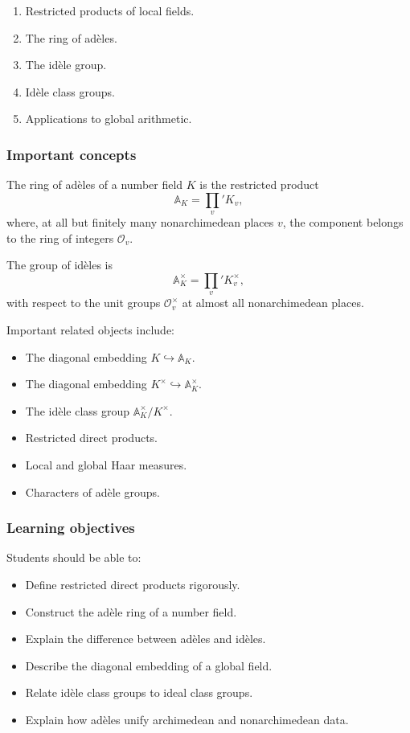 \documentclass[11pt]{article}
\begin{document}
\begin{enumerate}
    \item Restricted products of local fields.
    \item The ring of adèles.
    \item The idèle group.
    \item Idèle class groups.
    \item Applications to global arithmetic.
\end{enumerate}

\subsubsection*{Important concepts}

The ring of adèles of a number field \(K\) is the restricted product
\[
    \mathbb{A}_K
    =
    \prod_v' K_v,
\]
where, at all but finitely many nonarchimedean places \(v\), the component
belongs to the ring of integers \(\mathcal{O}_v\).

The group of idèles is
\[
    \mathbb{A}_K^\times
    =
    \prod_v' K_v^\times,
\]
with respect to the unit groups \(\mathcal{O}_v^\times\) at almost all
nonarchimedean places.

Important related objects include:

\begin{itemize}
    \item The diagonal embedding \(K\hookrightarrow\mathbb{A}_K\).
    \item The diagonal embedding \(K^\times\hookrightarrow\mathbb{A}_K^\times\).
    \item The idèle class group
          \(\mathbb{A}_K^\times/K^\times\).
    \item Restricted direct products.
    \item Local and global Haar measures.
    \item Characters of adèle groups.
\end{itemize}

\subsubsection*{Learning objectives}

Students should be able to:

\begin{itemize}
    \item Define restricted direct products rigorously.
    \item Construct the adèle ring of a number field.
    \item Explain the difference between adèles and idèles.
    \item Describe the diagonal embedding of a global field.
    \item Relate idèle class groups to ideal class groups.
    \item Explain how adèles unify archimedean and nonarchimedean data.
\end{itemize}
\end{document}
